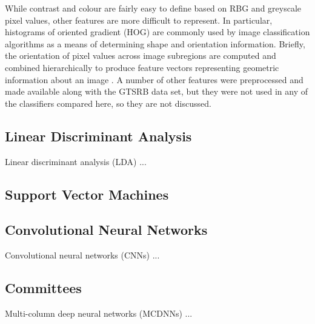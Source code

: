 \documentclass[letterpaper,twocolumn,10pt]{article}
\begin{document}
While contrast and colour are fairly easy to define based on RBG and greyscale pixel values, other features are more difficult to represent. In particular, histograms of oriented gradient (HOG) are commonly used by image classification algorithms as a means of determining shape and orientation information. Briefly, the orientation of pixel values across image subregions are computed and combined hierarchically to produce feature vectors representing geometric information about an image \cite{stallkamp_german_2011, stallkamp_man_2012}. A number of other features were preprocessed and made available along with the GTSRB data set, but they were not used in any of the classifiers compared here, so they are not discussed.


\subsection{Linear Discriminant Analysis}

Linear discriminant analysis (LDA) ...


\subsection{Support Vector Machines}



\subsection{Convolutional Neural Networks}

Convolutional neural networks (CNNs) ...


\subsection{Committees}

Multi-column deep neural networks (MCDNNs) ...

\end{document}
